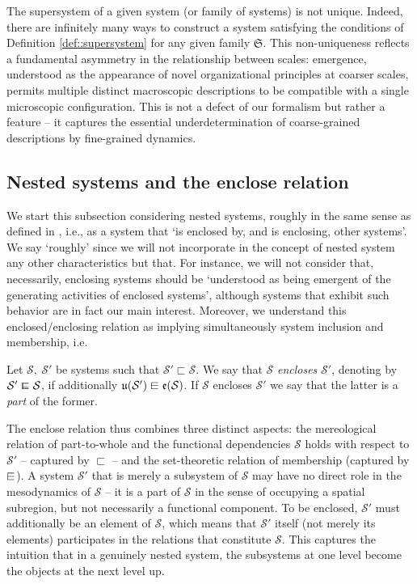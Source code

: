 \begin{remark}
The supersystem of a given system (or family of systems) is not unique. Indeed, there are infinitely many ways to construct a system satisfying the conditions of Definition \ref{def::supersystem} for any given family $\mathfrak{S}$. This non-uniqueness reflects a fundamental asymmetry in the relationship between scales: emergence, understood as the appearance of novel organizational principles at coarser scales, permits multiple distinct macroscopic descriptions to be compatible with a single microscopic configuration. This is not a defect of our formalism but rather a feature -- it captures the essential underdetermination of coarse-grained descriptions by fine-grained dynamics.
\end{remark}

\subsection{Nested systems and the enclose relation}

We start this subsection considering nested systems, roughly in the same sense as defined in \cite{Walloth2016}, i.e., as a system that `is enclosed by, and is enclosing, other systems'. We say `roughly' since we will not incorporate in the concept of nested system any other characteristics but that. For instance, we will not consider that, necessarily, enclosing systems should be `understood as being emergent of the generating activities of enclosed systems', although systems that exhibit such behavior are in fact our main interest. Moreover, we understand this enclosed/enclosing relation as implying simultaneously system inclusion and membership, i.e.

\begin{definition} \label{def::enclose}
	Let $\mathcal{S},\ \mathcal{S}'$ be systems such that $\mathcal{S}' \sqsubset \mathcal{S}$. We say that $\mathcal{S}$ \textit{encloses} $\mathcal{S}'$, denoting by $\mathcal{S}' \encl \mathcal{S}$, if additionally $\mathfrak{u}(\mathcal{S}') \sqin \mathfrak{e}(\mathcal{S})$. If $\mathcal{S}$ encloses $\mathcal{S}'$ we say that the latter is a \textit{part} of the former.
\end{definition}

The enclose relation thus combines three distinct aspects: the mereological relation of part-to-whole and the functional dependencies $\mathcal{S}$ holds with respect to  $\mathcal{S}'$ -- captured by $\sqsubset$ -- and the set-theoretic relation of membership (captured by $\sqin$). A system $\mathcal{S}'$ that is merely a subsystem of $\mathcal{S}$ may have no direct role in the mesodynamics of $\mathcal{S}$ -- it is a part of $\mathcal{S}$ in the sense of occupying a spatial subregion, but not necessarily a functional component. To be enclosed, $\mathcal{S}'$ must additionally be an element of $\mathcal{S}$, which means that $\mathcal{S}'$ itself (not merely its elements) participates in the relations that constitute $\mathcal{S}$. This captures the intuition that in a genuinely nested system, the subsystems at one level become the objects at the next level up.

